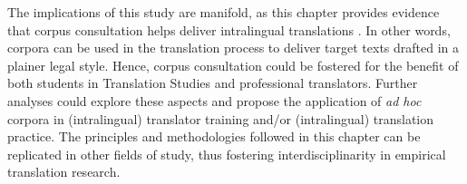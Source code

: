 \documentclass[output=paper]{langscibook}
\begin{document}
The implications of this study are manifold, as this chapter provides evidence that corpus consultation helps deliver intralingual translations \citep{Jakobson1959}. In other words, corpora can be used in the translation process to deliver target texts drafted in a plainer legal style. Hence, corpus consultation could be fostered for the benefit of both students in Translation Studies and professional translators. Further analyses could explore these aspects and propose the application of \textit{ad hoc} corpora in (intralingual) translator training and/or (intralingual) translation practice. The principles and methodologies followed in this chapter can be replicated in other fields of study, thus fostering interdisciplinarity in empirical translation research.

\sloppy\printbibliography[heading=subbibliography,notkeyword=this]
\end{document}
